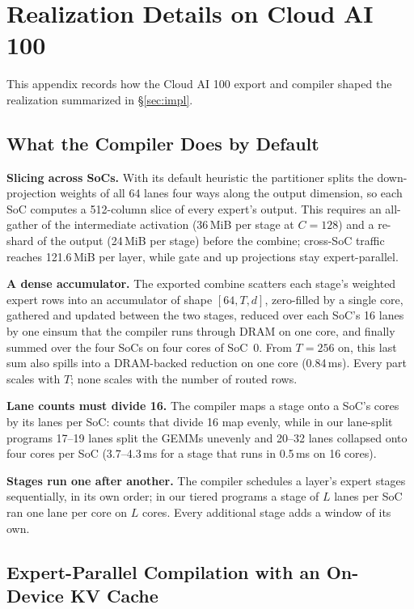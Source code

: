 \section{Realization Details on Cloud AI 100}
\label{app:impl}

This appendix records how the Cloud AI 100 export and compiler shaped the realization summarized in \S\ref{sec:impl}.

\subsection{What the Compiler Does by Default}
\label{app:impl-default}

\textbf{Slicing across SoCs.} With its default heuristic the partitioner splits the down-projection weights of all 64
lanes four ways along the output dimension, so each SoC computes a 512-column slice of every expert's output. This
requires an all-gather of the intermediate activation (36\,MiB per stage at $C=128$) and a re-shard of the output
(24\,MiB per stage) before the combine; cross-SoC traffic reaches 121.6\,MiB per layer, while gate and up projections stay
expert-parallel.

\textbf{A dense accumulator.} The exported combine scatters each stage's weighted expert rows into an accumulator of
shape $[64, T, d]$, zero-filled by a single core, gathered and updated between the two stages, reduced over each SoC's
16 lanes by one einsum that the compiler runs through DRAM on one core, and finally summed over the four SoCs on four
cores of SoC~0. From $T=256$ on, this last sum also spills into a DRAM-backed reduction on one core (0.84\,ms). Every
part scales with $T$; none scales with the number of routed rows.

\textbf{Lane counts must divide 16.} The compiler maps a stage onto a SoC's cores by its lanes per SoC: counts that divide
16 map evenly, while in our lane-split programs 17--19 lanes split the GEMMs unevenly and 20--32 lanes collapsed onto four
cores per SoC (3.7--4.3\,ms for a stage that runs in 0.5\,ms on 16 cores).

\textbf{Stages run one after another.} The compiler schedules a layer's expert stages sequentially, in its own order;
in our tiered programs a stage of $L$ lanes per SoC ran one lane per core on $L$ cores. Every additional stage adds a
window of its own.

\subsection{Expert-Parallel Compilation with an On-Device KV Cache}
\label{sec:ep}


